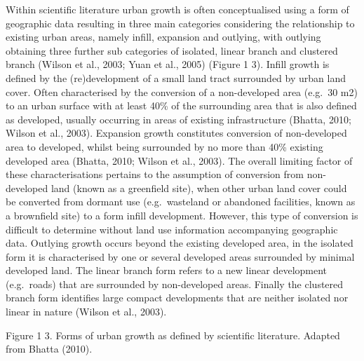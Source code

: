 \documentclass[]{book}
\begin{document}
Within scientific literature urban growth is often conceptualised using
a form of geographic data resulting in three main categories considering
the relationship to existing urban areas, namely infill, expansion and
outlying, with outlying obtaining three further sub categories of
isolated, linear branch and clustered branch (Wilson et al., 2003; Yuan
et al., 2005) (Figure 1 3). Infill growth is defined by the
(re)development of a small land tract surrounded by urban land cover.
Often characterised by the conversion of a non-developed area (e.g.~30
m2) to an urban surface with at least 40\% of the surrounding area that
is also defined as developed, usually occurring in areas of existing
infrastructure (Bhatta, 2010; Wilson et al., 2003). Expansion growth
constitutes conversion of non-developed area to developed, whilst being
surrounded by no more than 40\% existing developed area (Bhatta, 2010;
Wilson et al., 2003). The overall limiting factor of these
characterisations pertains to the assumption of conversion from
non-developed land (known as a greenfield site), when other urban land
cover could be converted from dormant use (e.g.~wasteland or abandoned
facilities, known as a brownfield site) to a form infill development.
However, this type of conversion is difficult to determine without land
use information accompanying geographic data. Outlying growth occurs
beyond the existing developed area, in the isolated form it is
characterised by one or several developed areas surrounded by minimal
developed land. The linear branch form refers to a new linear
development (e.g.~roads) that are surrounded by non-developed areas.
Finally the clustered branch form identifies large compact developments
that are neither isolated nor linear in nature (Wilson et al., 2003).

Figure 1 3. Forms of urban growth as defined by scientific literature.
Adapted from Bhatta (2010).
\end{document}
